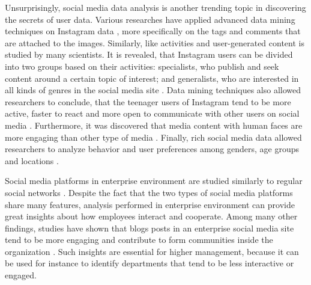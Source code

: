 Unsurprisingly, social media data analysis is another trending topic in discovering the secrets of user data. Various researches have applied advanced data mining techniques on Instagram data \cite{jang2015noreciprocity, bakhshi2014faces, hu2014we, jang2016teensengagemorewithfewerphotos, han2016teensarefrommars}, more specifically on the tags and comments that are attached to the images. Similarly, like activities and user-generated content is studied by many scientists. It is revealed, that Instagram users can be divided into two groups based on their activities: specialists, who publish and seek content around a certain topic of interest; and generalists, who are interested in all kinds of genres in the social media site \cite{jang2015noreciprocity}. Data mining techniques also allowed researchers to conclude, that the teenager users of Instagram tend to be more active, faster to react and more open to communicate with other users on social media \cite{jang2016teensengagemorewithfewerphotos, han2016teensarefrommars}. Furthermore, it was discovered that media content with human faces are more engaging than other type of media \cite{bakhshi2014faces}. Finally, rich social media data allowed researchers to analyze behavior and user preferences among genders, age groups and locations \cite{farseev2015harvestingmultiplesources}.

Social media platforms in enterprise environment are studied similarly to regular social networks \cite{guy2016whatsyourorganizationlike}. Despite the fact that the two types of social media platforms share many features, analysis performed in enterprise environment can provide great insights about how employees interact and cooperate. Among many other findings, studies have shown that blogs posts in an enterprise social media site tend to be more engaging and contribute to form communities inside the organization \cite{guy2016whatsyourorganizationlike}. Such insights are essential for higher management, because it can be used for instance to identify departments that tend to be less interactive or engaged.  


